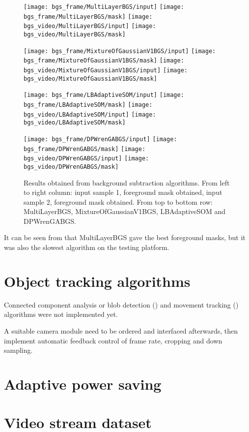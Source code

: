 \begin{figure}[H]
  \centering
  \texttt{[image: bgs\_frame/MultiLayerBGS/input]}
  \texttt{[image: bgs\_frame/MultiLayerBGS/mask]}
  \texttt{[image: bgs\_video/MultiLayerBGS/input]}
  \texttt{[image: bgs\_video/MultiLayerBGS/mask]}

  \texttt{[image: bgs\_frame/MixtureOfGaussianV1BGS/input]}
  \texttt{[image: bgs\_frame/MixtureOfGaussianV1BGS/mask]}
  \texttt{[image: bgs\_video/MixtureOfGaussianV1BGS/input]}
  \texttt{[image: bgs\_video/MixtureOfGaussianV1BGS/mask]}

  \texttt{[image: bgs\_frame/LBAdaptiveSOM/input]}
  \texttt{[image: bgs\_frame/LBAdaptiveSOM/mask]}
  \texttt{[image: bgs\_video/LBAdaptiveSOM/input]}
  \texttt{[image: bgs\_video/LBAdaptiveSOM/mask]}

  \texttt{[image: bgs\_frame/DPWrenGABGS/input]}
  \texttt{[image: bgs\_frame/DPWrenGABGS/mask]}
  \texttt{[image: bgs\_video/DPWrenGABGS/input]}
  \texttt{[image: bgs\_video/DPWrenGABGS/mask]}
  \caption{Results obtained from background subtraction algorithms. From left to right column: input sample 1, foreground mask obtained, input sample 2, foreground mask obtained. From top to bottom row: MultiLayerBGS, MixtureOfGaussianV1BGS, LBAdaptiveSOM and DPWrenGABGS.}
  \label{Figure:bgs_frame}
\end{figure}

It can be seen from  that MultiLayerBGS gave the best foreground masks, but it was also the slowest algorithm on the testing platform.

\section{Object tracking algorithms}

Connected component analysis or blob detection () and movement tracking () algorithms were not implemented yet.

A suitable camera module need to be ordered and interfaced afterwards, then implement automatic feedback control of frame rate, cropping and down sampling.

\section{Adaptive power saving}

\section{Video stream dataset}

